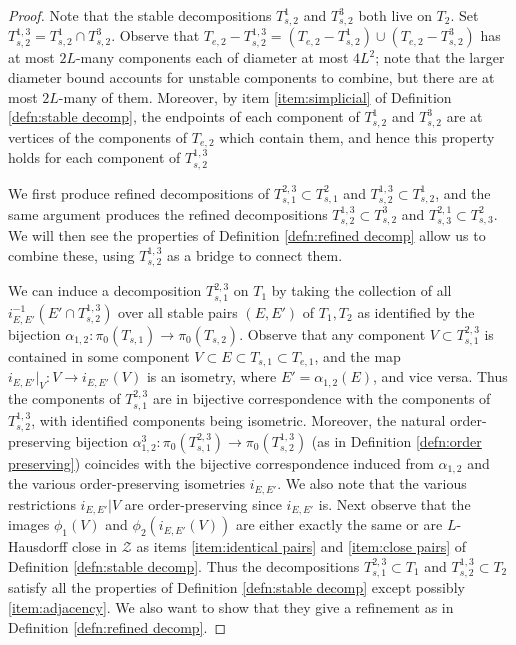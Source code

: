\documentclass{amsart}
\theoremstyle{definition}
\theoremstyle{remark}
\theoremstyle{definition}
\newcommand{\calZ}{\mathcal{Z}}
\begin{document}
\begin{proof}
Note that the stable decompositions $T^1_{s,2}$ and $T^3_{s,2}$ both live on $T_2$.  Set $T^{1,3}_{s,2} = T^1_{s,2} \cap T^3_{s,2}$.  Observe that $T_{e,2} - T^{1,3}_{s,2} = (T_{e,2} - T^1_{s,2}) \cup (T_{e,2} - T^3_{s,2})$ has at most $2L$-many components each of diameter at most $4L^2$; note that the larger diameter bound accounts for unstable components to combine, but there are at most $2L$-many of them.  Moreover, by item \eqref{item:simplicial} of Definition \ref{defn:stable decomp}, the endpoints of each component of $T^1_{s,2}$ and $T^3_{s,2}$ are at vertices of the components of $T_{e,2}$ which contain them, and hence this property holds for each component of $T^{1,3}_{s,2}$

We first produce refined decompositions of $T^{2,3}_{s,1} \subset T^2_{s,1}$ and $T^{1,3}_{s,2} \subset T^1_{s,2}$, and the same argument produces the refined decompositions $T^{1,3}_{s,2}  \subset T^3_{s,2}$ and $T^{2,1}_{s,3} \subset T^2_{s,3}$.  We will then see the properties of Definition \ref{defn:refined decomp} allow us to combine these, using $T^{1,3}_{s,2}$ as a bridge to connect them.

We can induce a decomposition $T^{2,3}_{s,1}$ on $T_1$ by taking the collection of all $i^{-1}_{E,E'}(E' \cap T^{1,3}_{s,2})$ over all stable pairs $(E,E')$ of $T_1,T_2$ as identified by the bijection $\alpha_{1,2}:\pi_0(T_{s,1}) \to \pi_0(T_{s,2})$.  Observe that any component $V \subset T^{2,3}_{s,1}$ is contained in some component $V \subset E \subset T_{s,1} \subset T_{e,1}$, and the map $i_{E,E'}|_V:V \to i_{E,E'}(V)$ is an isometry, where $E' = \alpha_{1,2}(E)$, and vice versa.  Thus the components of $T^{2,3}_{s,1}$ are in bijective correspondence with the components of $T^{1,3}_{s,2}$, with identified components being isometric.  Moreover,  the natural order-preserving bijection $\alpha^3_{1,2}:\pi_0(T^{2,3}_{s,1}) \to \pi_0(T^{1,3}_{s,2})$ (as in Definition \ref{defn:order preserving}) coincides with the bijective correspondence induced from $\alpha_{1,2}$ and the various order-preserving isometries $i_{E,E'}$.  We also note that the various restrictions $i_{E,E'}|V$ are order-preserving since $i_{E,E'}$ is.  Next observe that the images $\phi_1(V)$ and $\phi_2(i_{E,E'}(V))$ are either exactly the same or are $L$-Hausdorff close in $\calZ$ as items \eqref{item:identical pairs} and \eqref{item:close pairs} of Definition \ref{defn:stable decomp}.  Thus the decompositions $T^{2,3}_{s,1} \subset T_1$ and $T^{1,3}_{s,2} \subset T_2$ satisfy all the properties of Definition \ref{defn:stable decomp} except possibly \eqref{item:adjacency}.  We also want to show that they give a refinement as in Definition \ref{defn:refined decomp}.


\end{proof}
\end{document}
